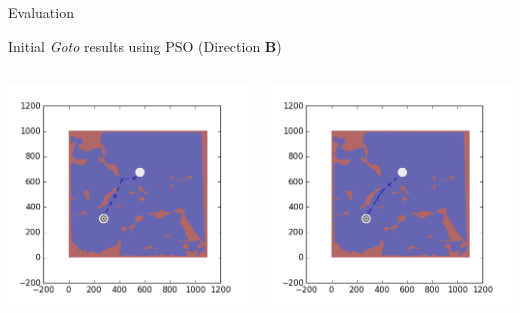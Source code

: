\documentclass[9pt]{beamer}
\begin{document}
\begin{frame}{Evaluation}
\begin{block}{Initial \textit{Goto} results using PSO (Direction \textbf{B})}
\begin{columns}
\begin{column}{0.25\textwidth}
\begin{center}
                    \includegraphics[width=\textwidth,trim={2cm 2cm 2cm 2cm},clip]{img/EXP3RG_PathAb_-1_-1_0_-1.png}
                \end{center}
            \end{column}
            \begin{column}{0.25\textwidth}
                \begin{center}
                    \includegraphics[width=\textwidth,trim={2cm 2cm 2cm 2cm},clip]{img/EXP3RG_PathAb_-1_-1_-1_0.png}

\end{center}
\end{column}
\end{columns}
\end{block}
\end{frame}
\end{document}
